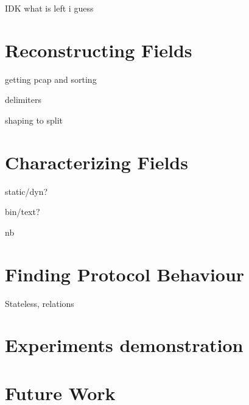 \documentclass{beamer}
\newcounter{m} %
\newcounter{c} %
\begin{document}
\begin{frame}
IDK what is left i guess
\end{frame}
%
%
%
%
%
%
%
%
\section{Reconstructing Fields}
\begin{frame}

	\tableofcontents[currentsection]
\end{frame}

\begin{frame}{getting pcap and sorting}

\end{frame}

%
\begin{frame}
delimiters

shaping to split

\end{frame}

\section {Characterizing Fields}
\begin{frame}

	\tableofcontents[currentsection]
\end{frame}

\begin{frame}
static/dyn?

bin/text?

nb
\end{frame}


\section{Finding Protocol Behaviour}
\begin{frame}

	\tableofcontents[currentsection]
\end{frame}

\begin{frame}
Stateless, relations
\end{frame}

\section{Experiments demonstration}
\begin{frame}

	\tableofcontents[currentsection]
\end{frame}

\section{Future Work}
\begin{frame}

	\tableofcontents[currentsection]
\end{frame}
\end{document}

